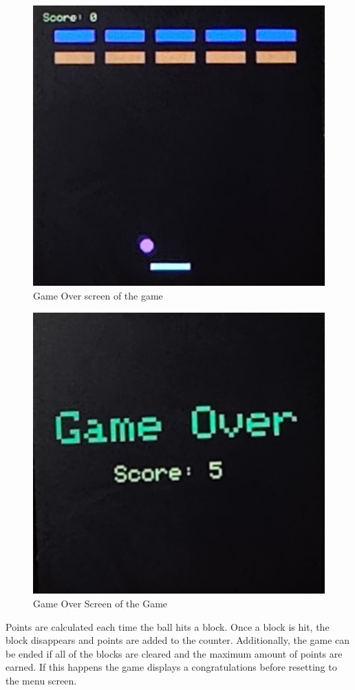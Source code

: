\documentclass[12pt]{article}
\begin{document}
\begin{figure}[!t]
\centering
\includegraphics[width=4.5in]{images/Breakout_Play_Zoom.jpg}
\caption{Game Over screen of the game}
\label{fig:playzoom}
\end{figure}

\begin{figure}[!t]
\centering
\includegraphics[width=4.5in]{images/Gameover_Screen_Zoom.jpg}
\caption{Game Over Screen of the Game}
\label{fig:gameoverzoom}
\end{figure}
Points are calculated each time the ball hits a block. Once a block is hit, the block disappears and points are added to the counter. Additionally, the game can be ended if all of the blocks are cleared and the maximum amount of points are earned. If this happens the game displays a congratulations before resetting to the menu screen.
\end{document}

